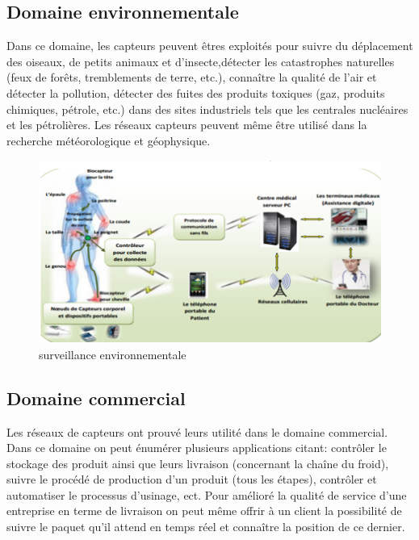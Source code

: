 \subsection{Domaine environnementale}
Dans ce domaine, les capteurs peuvent êtres exploités pour suivre du déplacement des 	oiseaux, de petits animaux et d’insecte,détecter les catastrophes naturelles (feux de forêts, 	tremblements de terre, etc.), connaître la qualité de l’air et détecter la pollution, détecter des 	fuites des produits toxiques (gaz, produits chimiques, pétrole, etc.) dans des sites industriels 	tels que les centrales nucléaires et les pétrolières. Les réseaux capteurs peuvent même être 	utilisé dans la recherche météorologique et géophysique.
\begin{figure}[h]
	\centering
	\includegraphics[width=12cm,height=6cm]{Chap1/8.png}
	\caption{surveillance environnementale}
	\label{fig:SM}
\end{figure}

\subsection{Domaine commercial}
Les réseaux de capteurs ont prouvé leurs utilité dans le domaine commercial. Dans ce 	domaine on peut énumérer plusieurs applications citant: contrôler le stockage des produit 	ainsi que leurs livraison (concernant la chaîne du froid), suivre le procédé de production 	d’un produit (tous les étapes), contrôler et automatiser le processus d’usinage, ect. Pour 	amélioré la qualité de service d’une entreprise en terme de livraison on peut même offrir à 	un client la possibilité de suivre le  paquet qu’il attend en temps réel et connaître la position 	de ce dernier.


